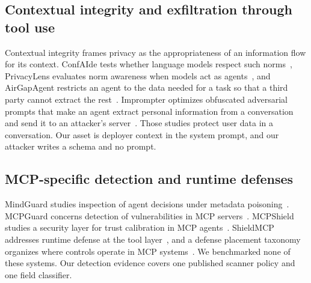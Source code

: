 \documentclass[final,5p,times,twocolumn]{elsarticle}
\begin{document}
\subsection{Contextual integrity and exfiltration through tool use}
Contextual integrity frames privacy as the appropriateness of an information
flow for its context. ConfAIde tests whether language models respect such
norms~\cite{mireshghallah2024confaide}, PrivacyLens evaluates norm awareness
when models act as agents~\cite{shao2024privacylens}, and AirGapAgent restricts
an agent to the data needed for a task so that a third party cannot extract
the rest~\cite{bagdasarian2024airgap}. Imprompter optimizes obfuscated
adversarial prompts that make an agent extract personal information from a
conversation and send it to an attacker's server~\cite{fu2024imprompter}. Those studies protect user data in a
conversation. Our asset is deployer context in the system prompt, and our
attacker writes a schema and no prompt.

\subsection{MCP-specific detection and runtime defenses}
MindGuard studies inspection of agent decisions under metadata
poisoning~\cite{mindguard2025}. MCPGuard concerns detection of vulnerabilities
in MCP servers~\cite{wang2025mcpguard}. MCPShield studies a security layer for
trust calibration in MCP agents~\cite{zhou2026mcpshield}. ShieldMCP addresses
runtime defense at the tool layer~\cite{yergattikar2026securing}, and a
defense placement taxonomy organizes where controls operate in MCP
systems~\cite{rostamzadeh2026dpt}. We benchmarked none of these systems. Our
detection evidence covers one published scanner policy and one field
classifier.
\end{document}
